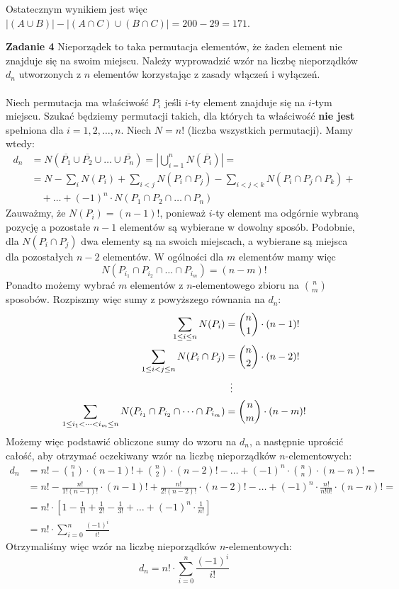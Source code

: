 \documentclass[a4paper,12pt]{article}
\newcommand{\comp}[1]{\overline{ #1 }} 					%
\begin{document}
\noindent Ostatecznym wynikiem jest więc $|(A \cup B)| - |(A \cap C) \cup (B \cap C)| = 200 - 29 = 171$.


\newpage
\noindent \textbf{Zadanie 4} \newline
Nieporządek to taka permutacja elementów, że żaden element nie znajduje się na swoim miejscu. Należy wyprowadzić wzór na liczbę nieporządków $d_n$ utworzonych z $n$ elementów korzystając z zasady włączeń i wyłączeń. \\ \\
Niech permutacja ma właściwość $P_i$ jeśli $i$-ty element znajduje się na $i$-tym miejscu. Szukać będziemy permutacji takich, dla których ta właściwość \textbf{nie jest} spełniona dla $i=1,2,\dots, n$. Niech $N = n!$ (liczba wszystkich permutacji). Mamy wtedy:
\begin{align*}
d_n &= N(\comp{P_1} \cup \comp{P_2} \cup \dots \cup \comp{P_n}) = \left| \bigcup\limits_{i=1}^{n} N(\comp{P_i}) \right| = \\
	&= N - \sum_{i}  N(P_i)  + \sum_{i < j}  N(P_i \cap P_j) - \sum_{i < j < k} N(P_i \cap P_j \cap P_k) + \\
	&\quad + \dots + (-1)^n\cdot N(P_1 \cap P_2 \cap \dots \cap P_n)
\end{align*}
Zauważmy, że $N(P_i) = (n - 1)!$, ponieważ $i$-ty element ma odgórnie wybraną pozycję a pozostałe $n - 1$ elementów są wybierane w dowolny sposób. Podobnie, dla $N(P_i \cap P_j)$ dwa elementy są na swoich miejscach, a wybierane są miejsca dla pozostałych $n-2$ elementów. W ogólności dla $m$ elementów mamy więc
\[ N(P_{i_1} \cap P_{i_2} \cap \dots \cap P_{i_m}) = (n - m)! \]
Ponadto możemy wybrać $m$ elementów z $n$-elementowego zbioru na $\binom{n}{m}$ sposobów. Rozpiszmy więc sumy z powyższego równania na $d_n$:
\begin{align*}
	\sum_{1 \leq i \leq n} N(P_i) &= \binom{n}{1} \cdot (n - 1)! \\
	\sum_{1 \leq i < j \leq n} N(P_i \cap P_j) &= \binom{n}{2} \cdot (n - 2)! \\
	&\hspace{0.5em} \vdots \\
	\sum_{1 \leq i_1 < \dots < i_m \leq n} N(P_{i_1} \cap P_{i_2} \cap \dots \cap P_{i_m}) &= \binom{n}{m} \cdot (n - m)! 
\end{align*}
Możemy więc podstawić obliczone sumy do wzoru na $d_n$, a następnie uprościć całość, aby otrzymać oczekiwany wzór na liczbę nieporządków $n$-elementowych:
\begin{align*}
	d_n &= n! - \binom{n}{1} \cdot (n - 1)! + \binom{n}{2} \cdot (n - 2)! - \dots + (-1)^n \cdot \binom{n}{n} \cdot (n - n)! = \\
		&= n! - \frac{n!}{1! (n - 1)!}\cdot (n - 1)! + \frac{n!}{2! (n - 2)!}\cdot (n - 2)! - \dots + (-1)^n \cdot \frac{n!}{n!0!}\cdot (n - n)! = \\
		&= n! \cdot \left[ 1 - \frac{1}{1!} + \frac{1}{2!} - \frac{1}{3!} + \dots + (-1)^n \cdot \frac{1}{n!} \right] \\
		&= n! \cdot \sum_{i=0}^{n} \frac{(-1)^i}{i!}
\end{align*}
Otrzymaliśmy więc wzór na liczbę nieporządków $n$-elementowych:
\[ d_n = n! \cdot \sum\limits_{i=0}^{n} \frac{(-1)^i}{i!} \]
\end{document}
